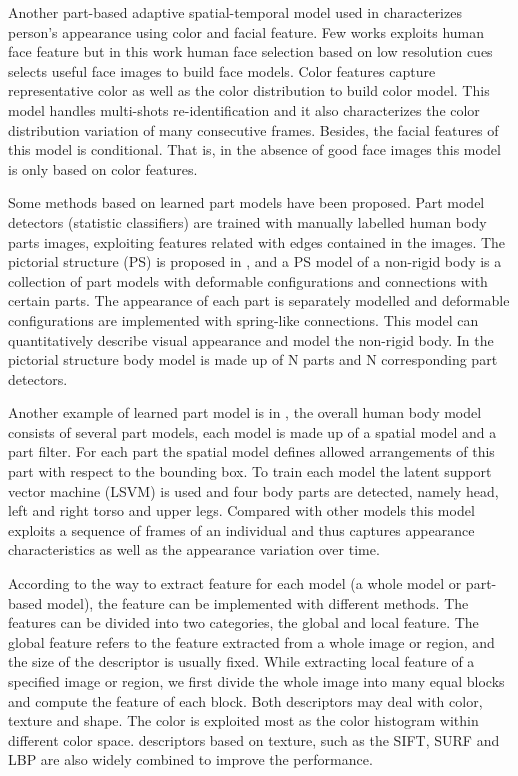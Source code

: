 \indent Another part-based adaptive spatial-temporal model used in \cite{PartbasedSTReid} characterizes person's appearance using color and facial feature. Few works exploits human face feature but in this work human face selection based on low resolution cues selects useful face images to build face models. Color features capture representative color as well as the color distribution to build color model. This model handles multi-shots re-identification and it also characterizes the color distribution variation of many consecutive frames.  Besides, the facial features of this model is conditional. That is, in the absence of good face images this model is only based on color features.

Some methods based on learned part models have been proposed. Part model detectors (statistic classifiers) are trained with manually labelled human body parts images, exploiting features related with edges contained in the images. The pictorial structure (PS) is proposed in \cite{PictorialModel}, and a PS model of a non-rigid body is a collection of part models with deformable configurations and connections with certain parts. The appearance of each part is separately modelled and deformable configurations are implemented with spring-like connections. This model can quantitatively describe visual appearance and model the non-rigid body. In \cite{PSmodelRevisit} the pictorial structure body model is made up of N parts and N corresponding part detectors. 

Another example of learned part model is in \cite{MultiPersonREID, PartbasedSTReid}, the overall human body model consists of several part models, each model is made up of a spatial model and a part filter. For each part the spatial model defines allowed arrangements of this part with respect to the bounding box. To train each model the latent support vector machine (LSVM) is used and four body parts are detected, namely head, left and right torso and upper legs. Compared with other models this model exploits a sequence of frames of an individual and thus captures appearance characteristics as well as the appearance variation over time.

According to the way to extract feature for each model (a whole model or part-based model), the feature can be implemented with different methods. The features can be divided into two categories, the global and local feature. The global feature refers to the feature extracted from a whole image or region, and the size of the descriptor is usually fixed. While extracting local feature of a specified image or region, we first divide the whole image into many equal blocks and compute the feature of each block.  Both descriptors may deal with color, texture and shape. The color is exploited most as the color histogram within different color space. descriptors based on texture, such as the SIFT, SURF and LBP are also widely combined to improve the performance.

